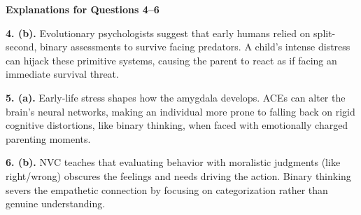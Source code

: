 \begin{practiceexercise}
\textbf{Explanations for Questions 4--6}

\textbf{4. (b).} Evolutionary psychologists suggest that early humans relied on split-second, binary assessments to survive facing predators. A child's intense distress can hijack these primitive systems, causing the parent to react as if facing an immediate survival threat.

\textbf{5. (a).} Early-life stress shapes how the amygdala develops. ACEs can alter the brain's neural networks, making an individual more prone to falling back on rigid cognitive distortions, like binary thinking, when faced with emotionally charged parenting moments.

\textbf{6. (b).} NVC teaches that evaluating behavior with moralistic judgments (like right/wrong) obscures the feelings and needs driving the action. Binary thinking severs the empathetic connection by focusing on categorization rather than genuine understanding.
\vspace{\fill}
\newpage


\end{practiceexercise}
